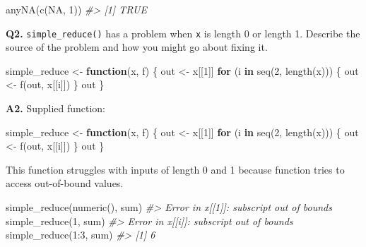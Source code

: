 \documentclass[
]{book}
\newenvironment{Shaded}{\begin{snugshade}}{\end{snugshade}}
\newcommand{\CommentTok}[1]{\textcolor[rgb]{0.56,0.35,0.01}{\textit{#1}}}
\newcommand{\ConstantTok}[1]{\textcolor[rgb]{0.00,0.00,0.00}{#1}}
\newcommand{\ControlFlowTok}[1]{\textcolor[rgb]{0.13,0.29,0.53}{\textbf{#1}}}
\newcommand{\DecValTok}[1]{\textcolor[rgb]{0.00,0.00,0.81}{#1}}
\newcommand{\FunctionTok}[1]{\textcolor[rgb]{0.00,0.00,0.00}{#1}}
\newcommand{\NormalTok}[1]{#1}
\newcommand{\OtherTok}[1]{\textcolor[rgb]{0.56,0.35,0.01}{#1}}
\newcommand{\SpecialCharTok}[1]{\textcolor[rgb]{0.00,0.00,0.00}{#1}}
\begin{document}
\begin{Shaded}
\begin{Highlighting}[]
\FunctionTok{anyNA}\NormalTok{(}\FunctionTok{c}\NormalTok{(}\ConstantTok{NA}\NormalTok{, }\DecValTok{1}\NormalTok{))}
\CommentTok{\#\textgreater{} [1] TRUE}
\end{Highlighting}
\end{Shaded}

\textbf{Q2.} \texttt{simple\_reduce()} has a problem when \texttt{x} is length 0 or length 1. Describe the source of the problem and how you might go about fixing it.

\begin{Shaded}
\begin{Highlighting}[]
\NormalTok{simple\_reduce }\OtherTok{\textless{}{-}} \ControlFlowTok{function}\NormalTok{(x, f) \{}
\NormalTok{  out }\OtherTok{\textless{}{-}}\NormalTok{ x[[}\DecValTok{1}\NormalTok{]]}
  \ControlFlowTok{for}\NormalTok{ (i }\ControlFlowTok{in} \FunctionTok{seq}\NormalTok{(}\DecValTok{2}\NormalTok{, }\FunctionTok{length}\NormalTok{(x))) \{}
\NormalTok{    out }\OtherTok{\textless{}{-}} \FunctionTok{f}\NormalTok{(out, x[[i]])}
\NormalTok{  \}}
\NormalTok{  out}
\NormalTok{\}}
\end{Highlighting}
\end{Shaded}

\textbf{A2.} Supplied function:

\begin{Shaded}
\begin{Highlighting}[]
\NormalTok{simple\_reduce }\OtherTok{\textless{}{-}} \ControlFlowTok{function}\NormalTok{(x, f) \{}
\NormalTok{  out }\OtherTok{\textless{}{-}}\NormalTok{ x[[}\DecValTok{1}\NormalTok{]]}
  \ControlFlowTok{for}\NormalTok{ (i }\ControlFlowTok{in} \FunctionTok{seq}\NormalTok{(}\DecValTok{2}\NormalTok{, }\FunctionTok{length}\NormalTok{(x))) \{}
\NormalTok{    out }\OtherTok{\textless{}{-}} \FunctionTok{f}\NormalTok{(out, x[[i]])}
\NormalTok{  \}}
\NormalTok{  out}
\NormalTok{\}}
\end{Highlighting}
\end{Shaded}

This function struggles with inputs of length 0 and 1 because function tries to access out-of-bound values.

\begin{Shaded}
\begin{Highlighting}[]
\FunctionTok{simple\_reduce}\NormalTok{(}\FunctionTok{numeric}\NormalTok{(), sum)}
\CommentTok{\#\textgreater{} Error in x[[1]]: subscript out of bounds}
\FunctionTok{simple\_reduce}\NormalTok{(}\DecValTok{1}\NormalTok{, sum)}
\CommentTok{\#\textgreater{} Error in x[[i]]: subscript out of bounds}
\FunctionTok{simple\_reduce}\NormalTok{(}\DecValTok{1}\SpecialCharTok{:}\DecValTok{3}\NormalTok{, sum)}
\CommentTok{\#\textgreater{} [1] 6}
\end{Highlighting}
\end{Shaded}
\end{document}
